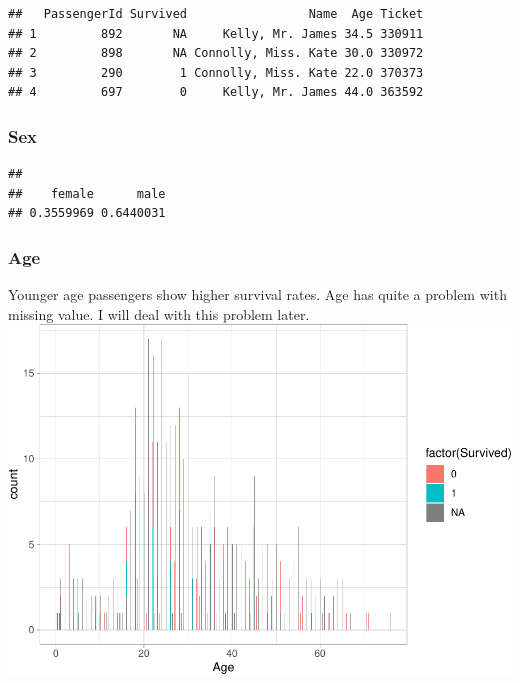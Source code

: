 \documentclass[
]{article}
\newenvironment{Shaded}{\begin{snugshade}}{\end{snugshade}}
\newcommand{\FunctionTok}[1]{\textcolor[rgb]{0.00,0.00,0.00}{#1}}
\newcommand{\NormalTok}[1]{#1}
\newcommand{\SpecialCharTok}[1]{\textcolor[rgb]{0.00,0.00,0.00}{#1}}
\begin{document}
\begin{verbatim}
##   PassengerId Survived                 Name  Age Ticket
## 1         892       NA     Kelly, Mr. James 34.5 330911
## 2         898       NA Connolly, Miss. Kate 30.0 330972
## 3         290        1 Connolly, Miss. Kate 22.0 370373
## 4         697        0     Kelly, Mr. James 44.0 363592
\end{verbatim}

\hypertarget{sex}{%
\subsubsection{\texorpdfstring{\textbf{Sex}}{Sex}}\label{sex}}

\begin{Shaded}
\end{Shaded}

\begin{verbatim}
## 
##    female      male 
## 0.3559969 0.6440031
\end{verbatim}

\hypertarget{age}{%
\subsubsection{\texorpdfstring{\textbf{Age}}{Age}}\label{age}}

Younger age passengers show higher survival rates. Age has quite a
problem with missing value. I will deal with this problem later.
\includegraphics{final_pdf_files/figure-latex/unnamed-chunk-11-1.pdf}
\end{document}
